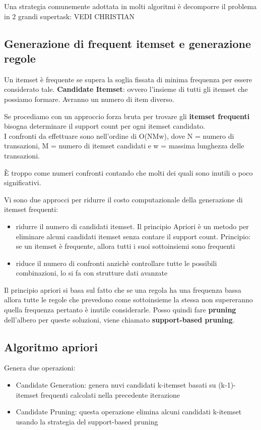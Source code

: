 Una strategia comunemente adottata in molti algoritmi \`e decomporre il problema in 2 grandi supertask:
VEDI CHRISTIAN


\subsection{Generazione di frequent itemset e generazione regole}

Un itemset \`e frequente se supera la soglia fissata di minima frequenza per essere considerato tale. 
\textbf{Candidate Itemset}: ovvero l'insieme di tutti gli itemset che possiamo formare. Avranno un numero di item diverso. 

Se procediamo con un approccio forza bruta per trovare gli \textbf{itemset frequenti} bisogna determinare il support count per ogni itemset candidato. \\
I confronti da effettuare sono nell'ordine di O(NMw), dove N = numero di transazioni, M = numero di itemset candidati e w = massima lunghezza delle transazioni. 

\`E troppo come numeri confronti contando che molti dei quali sono inutili o poco significativi.

Vi sono due approcci per ridurre il costo computazionale della generazione di itemset frequenti:
\begin{itemize}
	\item ridurre il numero di candidati itemset. Il principio Apriori \`e un metodo per eliminare alcuni candidati itemset senza contare il support count. Principio: se un itemset \`e frequente, allora tutti i suoi sottoinsiemi sono frequenti
	\item riduce il numero di confronti anzich\`e controllare tutte le possibili combinazioni, lo si fa con strutture dati avanzate
\end{itemize}

Il principio apriori si basa sul fatto che se una regola ha una frequenza bassa allora tutte le regole che prevedono come sottoinsieme la stessa non supereranno quella frequenza pertanto \`e inutile considerarle. Posso quindi fare \textbf{pruning} dell'albero per queste soluzioni, viene chiamato \textbf{support-based pruning}.

\subsection{Algoritmo apriori}
Genera due operazioni:
\begin{itemize}
	\item Candidate Generation: genera nuvi candidati k-itemset basati su (k-1)-itemset frequenti calcolati nella precedente iterazione
	\item Candidate Pruning: questa operazione elimina alcuni candidati k-itemset usando la strategia del support-based pruning
\end{itemize}

